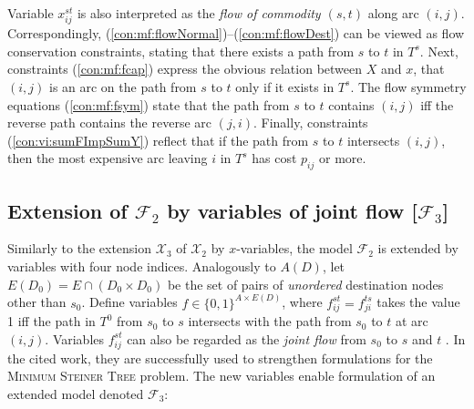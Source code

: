 Variable $x_{ij}^{st}$ is also interpreted as the \emph{flow of commodity $(s,t)$} along arc $(i,j)$.
Correspondingly, (\ref{con:mf:flowNormal})--(\ref{con:mf:flowDest}) can be viewed as flow conservation constraints,
stating that there exists a path from $s$ to $t$ in $T^s$.
Next, constraints (\ref{con:mf:fcap}) express the obvious relation between $X$ and $x$, that $(i,j)$ is an arc on the path from $s$ to $t$ only if it exists in $T^s$.
The flow symmetry equations (\ref{con:mf:fsym}) state that the path from $s$ to $t$ contains $(i,j)$ iff the reverse path contains the reverse arc $(j,i)$.
Finally, constraints (\ref{con:vi:sumFImpSumY}) reflect that if the path from $s$ to $t$ intersects $(i,j)$,
then the most expensive arc leaving $i$ in $T^s$ has cost $p_{ij}$ or more.


\subsection{Extension of $\mathcal{F}_2$ by variables of joint flow [$\mathcal{F}_3$]}

Similarly to the extension $\mathcal{X}_3$ of $\mathcal{X}_2$ by $x$-variables, the model $\mathcal{F}_2$ is extended by variables with four node indices.
Analogously to $A(D)$, let $E(D_0)=E\cap (D_0\times D_0)$ be the set of pairs of \emph{unordered} destination nodes other than $s_0$.
Define variables $f\in\{0,1\}^{A\times E(D)}$, where
$f_{ij}^{st}=f_{ji}^{ts}$ takes the value 1 iff the path in $T^0$ from $s_0$ to $s$ intersects with the path from $s_0$ to $t$ at arc $(i,j)$.
%
Variables $f_{ij}^{st}$ can also be regarded as the \emph{joint flow} from $s_0$ to $s$ and $t$ \citep{Polzin}.
In the cited work, they are successfully used to strengthen formulations for the \textsc{Minimum Steiner Tree} problem.
The new variables enable formulation of an extended model denoted $\mathcal{F}_3$: 

